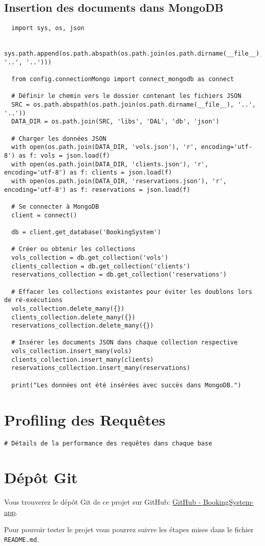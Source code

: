 \subsection{Insertion des documents dans MongoDB}
\label{ann:mongo_insert}
\begin{verbatim}
  import sys, os, json

  sys.path.append(os.path.abspath(os.path.join(os.path.dirname(__file__), '..', '..')))

  from config.connectionMongo import connect_mongodb as connect

  # Définir le chemin vers le dossier contenant les fichiers JSON
  SRC = os.path.abspath(os.path.join(os.path.dirname(__file__), '..', '..'))
  DATA_DIR = os.path.join(SRC, 'libs', 'DAL', 'db', 'json')

  # Charger les données JSON
  with open(os.path.join(DATA_DIR, 'vols.json'), 'r', encoding='utf-8') as f: vols = json.load(f)
  with open(os.path.join(DATA_DIR, 'clients.json'), 'r', encoding='utf-8') as f: clients = json.load(f)
  with open(os.path.join(DATA_DIR, 'reservations.json'), 'r', encoding='utf-8') as f: reservations = json.load(f)

  # Se connecter à MongoDB
  client = connect()

  db = client.get_database('BookingSystem')

  # Créer ou obtenir les collections
  vols_collection = db.get_collection('vols')
  clients_collection = db.get_collection('clients')
  reservations_collection = db.get_collection('reservations')

  # Effacer les collections existantes pour éviter les doublons lors de ré-exécutions
  vols_collection.delete_many({})
  clients_collection.delete_many({})
  reservations_collection.delete_many({})

  # Insérer les documents JSON dans chaque collection respective
  vols_collection.insert_many(vols)
  clients_collection.insert_many(clients)
  reservations_collection.insert_many(reservations)

  print("Les données ont été insérées avec succès dans MongoDB.")
\end{verbatim}

\section{Profiling des Requêtes}
\label{ann:profiling}
\begin{verbatim}
# Détails de la performance des requêtes dans chaque base
\end{verbatim}

\section{Dépôt Git}
\label{ann:git_repo}
Vous trouverez le dépôt Git de ce projet sur GitHub: \href{https://github.com/sessaadouni/BookingSystem-app}{GitHub - BookingSystem-app}.

Pour pouvoir tester le projet vous pourrez suivre les étapes mises dans le fichier \texttt{README.md}.